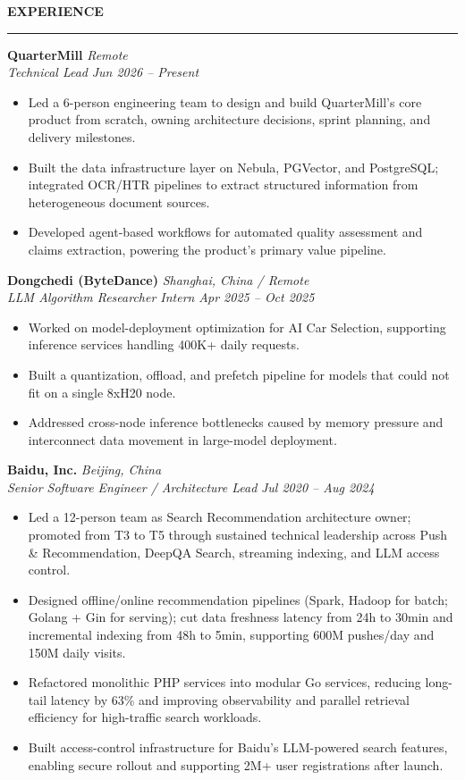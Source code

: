 \documentclass[]{resume}
\renewenvironment{rSection}[1]{%
  \vspace{0.3em}%
  \MakeUppercase{\textbf{#1}}%
  \vspace{0.16em}%
  \hrule
  \vspace{0.22em}%
  \begin{list}{}{%
    \setlength{\leftmargin}{0.85em}%
    \setlength{\rightmargin}{0em}%
    \setlength{\itemsep}{0pt}%
    \setlength{\topsep}{0pt}%
    \setlength{\parsep}{0pt}%
    \setlength{\partopsep}{0pt}%
  }%
  \item[]%
}{%
  \end{list}%
  \vspace{-0.28em}%
}
\newcommand{\entryspace}{\vspace{0.35ex}}
\begin{document}
\begin{rSection}{Experience}
\textbf{QuarterMill} \hfill \textit{Remote}\\
\textit{Technical Lead} \hfill \textit{Jun 2026 -- Present}
\begin{itemize}
    \item Led a 6-person engineering team to design and build QuarterMill's core product from scratch, owning architecture decisions, sprint planning, and delivery milestones.
    \item Built the data infrastructure layer on Nebula, PGVector, and PostgreSQL; integrated OCR/HTR pipelines to extract structured information from heterogeneous document sources.
    \item Developed agent-based workflows for automated quality assessment and claims extraction, powering the product's primary value pipeline.
\end{itemize}

\entryspace
\textbf{Dongchedi (ByteDance)} \hfill \textit{Shanghai, China / Remote}\\
\textit{LLM Algorithm Researcher Intern} \hfill \textit{Apr 2025 -- Oct 2025}
\begin{itemize}
    \item Worked on model-deployment optimization for AI Car Selection, supporting inference services handling 400K+ daily requests.
    \item Built a quantization, offload, and prefetch pipeline for models that could not fit on a single 8xH20 node.
    \item Addressed cross-node inference bottlenecks caused by memory pressure and interconnect data movement in large-model deployment.
\end{itemize}

\entryspace
\textbf{Baidu, Inc.} \hfill \textit{Beijing, China}\\
\textit{Senior Software Engineer / Architecture Lead} \hfill \textit{Jul 2020 -- Aug 2024}
\begin{itemize}
    \item Led a 12-person team as Search Recommendation architecture owner; promoted from T3 to T5 through sustained technical leadership across Push \& Recommendation, DeepQA Search, streaming indexing, and LLM access control.
    \item Designed offline/online recommendation pipelines (Spark, Hadoop for batch; Golang + Gin for serving); cut data freshness latency from 24h to 30min and incremental indexing from 48h to 5min, supporting 600M pushes/day and 150M daily visits.
    \item Refactored monolithic PHP services into modular Go services, reducing long-tail latency by 63\% and improving observability and parallel retrieval efficiency for high-traffic search workloads.
    \item Built access-control infrastructure for Baidu's LLM-powered search features, enabling secure rollout and supporting 2M+ user registrations after launch.
\end{itemize}
\end{rSection}
\end{document}
